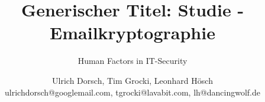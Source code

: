 \usepackage[utf8]{inputenc}

\title{Generischer Titel: Studie - Emailkryptographie}
\subtitle{Human Factors in IT-Security}
\author{Ulrich Dorsch, Tim Grocki, Leonhard Hösch  \\ {\tiny ulrichdorsch@googlemail.com, tgrocki@lavabit.com, lh@dancingwolf.de \\}}

